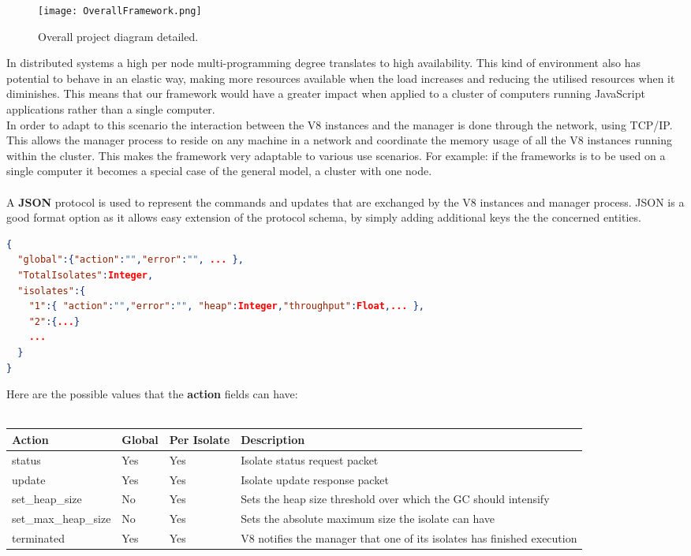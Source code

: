 \documentclass{l4proj}
\begin{document}
\begin{figure}[!ht]
  \centering
    \texttt{[image: OverallFramework.png]}
  \caption{Overall project diagram detailed.}
\end{figure}
\hspace*{3em} In distributed systems a high per node multi-programming degree translates to high availability. This kind of environment also has potential to behave in an elastic way, making more resources available when the load increases and reducing the utilised resources when it diminishes. This means that our framework would have a greater impact when applied to a cluster of computers running JavaScript applications rather than a single computer.\\
\hspace*{3em} In order to adapt to this scenario the interaction between the V8 instances and the manager is done through the network, using TCP/IP. This allows the manager process to reside on any machine in a network and coordinate the memory usage of all the V8 instances running within the cluster. This makes the framework very adaptable to various use scenarios. For example: if the frameworks is to be used on a single computer it becomes a special case of the general model, a cluster with one node.
\\\\
\hspace*{3em} A \textbf{JSON} protocol is used to represent the commands and updates that are exchanged by the V8 instances and manager process. JSON is a good format option as it allows easy extension of the protocol schema, by simply adding additional keys the the concerned entities.
\begin{lstlisting}[language=json,firstnumber=1]
{
  "global":{"action":"","error":"", ... },
  "TotalIsolates":Integer,
  "isolates":{
    "1":{ "action":"","error":"", "heap":Integer,"throughput":Float,... },
    "2":{...}
    ...
  }
}
\end{lstlisting}
Here are the possible values that the \textbf{action} fields can have:\\\\
\begin{tabular}{  l  l  l  l  }
  Action & Global & Per Isolate & Description \\
\hline
  status & Yes & Yes & Isolate status request packet\\
  update & Yes & Yes & Isolate update response packet\\
  set\_heap\_size & No & Yes & Sets the heap size threshold over which the GC should intensify\\
  set\_max\_heap\_size & No & Yes & Sets the absolute maximum size the isolate can have\\
  terminated & Yes & Yes & V8 notifies the manager that one of its isolates has finished execution\\
\hline
\end{tabular}
\end{document}
